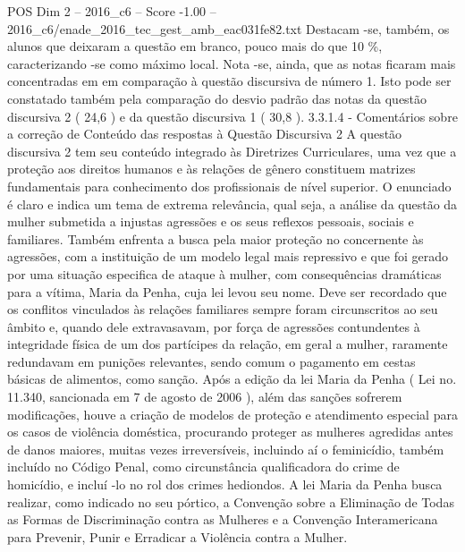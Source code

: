 \begin{textsample}{POS Dim 2 – 2016\_c6 – Score -1.00 – 2016\_c6/enade\_2016\_tec\_gest\_amb\_eac031fe82.txt}
Destacam -se, também, os alunos que deixaram a questão em branco, pouco mais do que 10 \%, caracterizando -se como máximo local.
Nota -se, ainda, que as notas ficaram mais concentradas em em comparação à questão discursiva de número 1.
Isto pode ser constatado também pela comparação do desvio padrão das notas da questão discursiva 2 ( 24,6 ) e da questão discursiva 1 ( 30,8 ). 3.3.1.4 - Comentários sobre a correção de Conteúdo das respostas à Questão Discursiva 2 A questão discursiva 2 tem seu conteúdo integrado às Diretrizes Curriculares, uma vez que a proteção aos direitos humanos e às relações de gênero constituem matrizes fundamentais para conhecimento dos profissionais de nível superior.
O enunciado é claro e indica um tema de extrema relevância, qual seja, a análise da questão da mulher submetida a injustas agressões e os seus reflexos pessoais, sociais e familiares.
Também enfrenta a busca pela maior proteção no concernente às agressões, com a instituição de um modelo legal mais repressivo e que foi gerado por uma situação especifica de ataque à mulher, com consequências dramáticas para a vítima, Maria da Penha, cuja lei levou seu nome.
Deve ser recordado que os conflitos vinculados às relações familiares sempre foram circunscritos ao seu âmbito e, quando dele extravasavam, por força de agressões contundentes à integridade física de um dos partícipes da relação, em geral a mulher, raramente redundavam em punições relevantes, sendo comum o pagamento em cestas básicas de alimentos, como sanção.
Após a edição da lei Maria da Penha ( Lei no. 11.340, sancionada em 7 de agosto de 2006 ), além das sanções sofrerem modificações, houve a criação de modelos de proteção e atendimento especial para os casos de violência doméstica, procurando proteger as mulheres agredidas antes de danos maiores, muitas vezes irreversíveis, incluindo aí o feminicídio, também incluído no Código Penal, como circunstância qualificadora do crime de homicídio, e incluí -lo no rol dos crimes hediondos.
A lei Maria da Penha busca realizar, como indicado no seu pórtico, a Convenção sobre a Eliminação de Todas as Formas de Discriminação contra as Mulheres e a Convenção Interamericana para Prevenir, Punir e Erradicar a Violência contra a Mulher.

\end{textsample}
